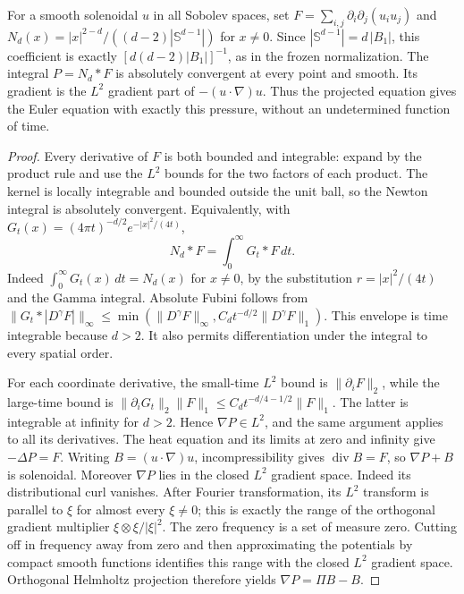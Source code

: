 \begin{lemma}\label{lem:newton}
For a smooth solenoidal $u$ in all Sobolev spaces, set
$F=\sum_{i,j}\partial_i\partial_j(u_i u_j)$ and
$N_d(x)=|x|^{2-d}/((d-2)|\mathbb S^{d-1}|)$ for $x\ne0$.
Since $|\mathbb S^{d-1}|=d\,|B_1|$, this coefficient is exactly
$[d(d-2)|B_1|]^{-1}$, as in the frozen normalization. The integral
$P=N_d*F$ is absolutely convergent at every point and smooth.
Its gradient is the $L^2$ gradient part of $-(u\cdot\nabla)u$.
Thus the projected equation gives the Euler equation with exactly this
pressure, without an undetermined function of time.
\end{lemma}
\begin{proof}
Every derivative of $F$ is both bounded and integrable: expand by the
product rule and use the $L^2$ bounds for the two factors of each product.
The kernel is locally integrable and bounded outside the unit ball, so
the Newton integral is absolutely convergent. Equivalently, with
$G_t(x)=(4\pi t)^{-d/2}e^{-|x|^2/(4t)}$,
\[
 N_d*F=\int_0^\infty G_t*F\,dt.
\]
Indeed $\int_0^\infty G_t(x)\,dt=N_d(x)$ for $x\ne0$, by the substitution
$r=|x|^2/(4t)$ and the Gamma integral. Absolute Fubini follows from
$\|G_t*|D^\gamma F|\|_\infty\leq
\min(\|D^\gamma F\|_\infty,C_dt^{-d/2}\|D^\gamma F\|_1)$.
This envelope is time integrable because $d>2$. It also permits
differentiation under the integral to every spatial order.

For each coordinate derivative, the small-time $L^2$ bound is
$\|\partial_i F\|_2$, while the large-time bound is
$\|\partial_iG_t\|_2\|F\|_1\leq C_dt^{-d/4-1/2}\|F\|_1$.
The latter is integrable at infinity for $d>2$. Hence $\nabla P\in L^2$,
and the same argument applies to all its derivatives. The heat equation
and its limits at zero and infinity give $-\Delta P=F$.
Writing $B=(u\cdot\nabla)u$, incompressibility gives
$\operatorname{div}B=F$, so $\nabla P+B$ is solenoidal.
Moreover $\nabla P$ lies in the closed $L^2$ gradient space. Indeed its
distributional curl vanishes. After Fourier transformation, its $L^2$
transform is parallel to $\xi$ for almost every $\xi\ne0$; this is
exactly the range of the orthogonal gradient multiplier
$\xi\otimes\xi/|\xi|^2$. The zero frequency is a set of measure zero.
Cutting off in frequency away from zero and then approximating the
potentials by compact smooth functions identifies this range with the
closed $L^2$ gradient space. Orthogonal
Helmholtz projection therefore yields $\nabla P=\Pi B-B$.


\end{proof}
